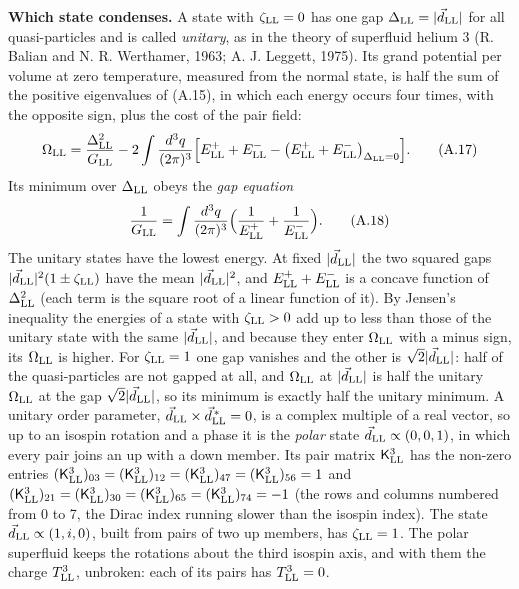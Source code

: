 \documentclass[
  10pt,
]{article}
\begin{document}
\textbf{Which state condenses.} A state with \(\zeta_{\rm LL}=0\) has
one gap \(\Delta_{\rm LL}=|\vec d_{\rm LL}|\) for all quasi-particles
and is called \emph{unitary}, as in the theory of superfluid helium 3
(R. Balian and N. R. Werthamer, 1963; A. J. Leggett, 1975). Its grand
potential per volume at zero temperature, measured from the normal
state, is half the sum of the positive eigenvalues of (A.15), in which
each energy occurs four times, with the opposite sign, plus the cost of
the pair field:
\[\Omega_{\rm LL}=\frac{\Delta_{\rm LL}^2}{G_{\rm LL}}-2\int\frac{d^3q}{(2\pi)^3}\Big[E^+_{\rm LL}+E^-_{\rm LL}-\big(E^+_{\rm LL}+E^-_{\rm LL}\big)_{\Delta_{\rm LL}=0}\Big].\tag{A.17}\]
Its minimum over \(\Delta_{\rm LL}\) obeys the \emph{gap equation}
\[\frac1{G_{\rm LL}}=\int\frac{d^3q}{(2\pi)^3}\Big(\frac1{E^+_{\rm LL}}+\frac1{E^-_{\rm LL}}\Big).\tag{A.18}\]
The unitary states have the lowest energy. At fixed
\(|\vec d_{\rm LL}|\) the two squared gaps
\(|\vec d_{\rm LL}|^2(1\pm\zeta_{\rm LL})\) have the mean
\(|\vec d_{\rm LL}|^2\), and \(E^+_{\rm LL}+E^-_{\rm LL}\) is a concave
function of \(\Delta_{\rm LL}^2\) (each term is the square root of a
linear function of it). By Jensen's inequality the energies of a state
with \(\zeta_{\rm LL}>0\) add up to less than those of the unitary state
with the same \(|\vec d_{\rm LL}|\), and because they enter
\(\Omega_{\rm LL}\) with a minus sign, its \(\Omega_{\rm LL}\) is
higher. For \(\zeta_{\rm LL}=1\) one gap vanishes and the other is
\(\sqrt2|\vec d_{\rm LL}|\): half of the quasi-particles are not gapped
at all, and \(\Omega_{\rm LL}\) at \(|\vec d_{\rm LL}|\) is half the
unitary \(\Omega_{\rm LL}\) at the gap \(\sqrt2|\vec d_{\rm LL}|\), so
its minimum is exactly half the unitary minimum. A unitary order
parameter, \(\vec d_{\rm LL}\times\vec d^{\,*}_{\rm LL}=0\), is a
complex multiple of a real vector, so up to an isospin rotation and a
phase it is the \emph{polar} state \(\vec d_{\rm LL}\propto(0,0,1)\), in
which every pair joins an up with a down member. Its pair matrix
\(\mathsf K^3_{\rm LL}\) has the non-zero entries
\((\mathsf K^3_{\rm LL})_{03}=(\mathsf K^3_{\rm LL})_{12}=(\mathsf K^3_{\rm LL})_{47}=(\mathsf K^3_{\rm LL})_{56}=1\)
and
\((\mathsf K^3_{\rm LL})_{21}=(\mathsf K^3_{\rm LL})_{30}=(\mathsf K^3_{\rm LL})_{65}=(\mathsf K^3_{\rm LL})_{74}=-1\)
(the rows and columns numbered from 0 to 7, the Dirac index running
slower than the isospin index). The state
\(\vec d_{\rm LL}\propto(1,i,0)\), built from pairs of two up members,
has \(\zeta_{\rm LL}=1\). The polar superfluid keeps the rotations about
the third isospin axis, and with them the charge \(T^3_{\rm LL}\),
unbroken: each of its pairs has \(T^3_{\rm LL}=0\).
\end{document}
